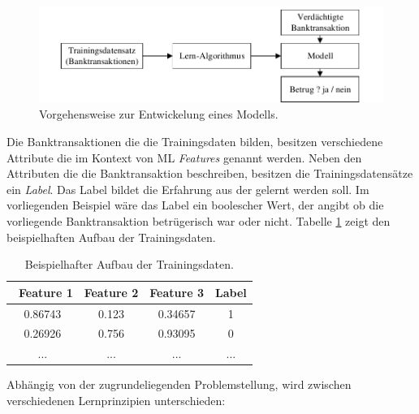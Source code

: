 \begin{figure}[ht]
\centering
\includegraphics{images/lernprozess.pdf}
\caption{Vorgehensweise zur Entwickelung eines Modells.}
\label{fig:lernprozess}
\end{figure}  

Die Banktransaktionen die die Trainingsdaten bilden, besitzen verschiedene Attribute die im Kontext von ML \emph{Features} genannt werden. Neben den Attributen die die Banktransaktion beschreiben, besitzen die Trainingsdatensätze ein \emph{Label}. Das Label bildet die Erfahrung aus der gelernt werden soll. Im vorliegenden Beispiel wäre das Label ein boolescher Wert, der angibt ob die vorliegende Banktransaktion betrügerisch war oder nicht. Tabelle \ref{tab:trainingset} zeigt den beispielhaften Aufbau der Trainingsdaten.

\begin{table}[ht]
\centering
\small
\begin{tabular}{cccc}
\toprule
\ Feature 1 & Feature 2 & Feature 3 & Label\\
\toprule
0.86743 & 0.123 & 0.34657 & 1\\\midrule
0.26926 & 0.756 & 0.93095 & 0\\\midrule
... & ... & ... & ...\\\bottomrule
\end{tabular}
\caption{Beispielhafter Aufbau der Trainingsdaten.}
\label{tab:trainingset}
\end{table}


Abhängig von der zugrundeliegenden Problemstellung, wird zwischen verschiedenen Lernprinzipien unterschieden:    

